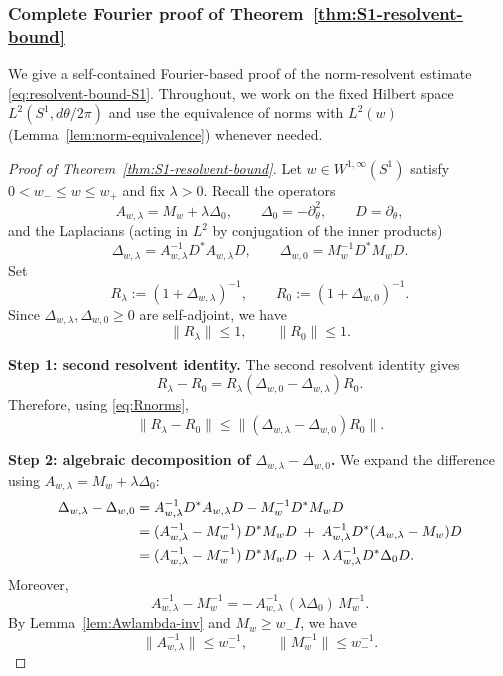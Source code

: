 \documentclass{amsart}
\numberwithin{equation}{section}
\theoremstyle{definition}
\theoremstyle{remark}
\begin{document}
\subsubsection{Complete Fourier proof of Theorem~\ref{thm:S1-resolvent-bound}}
\label{subsubsec:S1-complete-proof}

We give a self-contained Fourier-based proof of the norm-resolvent estimate
\eqref{eq:resolvent-bound-S1}. Throughout, we work on the fixed Hilbert space
$L^2(S^1,d\theta/2\pi)$ and use the equivalence of norms with $L^2(w)$
(Lemma~\ref{lem:norm-equivalence}) whenever needed.

\begin{proof}[Proof of Theorem~\ref{thm:S1-resolvent-bound}]
Let $w\in W^{1,\infty}(S^1)$ satisfy $0<w_-\le w\le w_+$ and fix $\lambda>0$.
Recall the operators
\[
A_{w,\lambda}=M_w+\lambda\Delta_0,\qquad \Delta_0=-\partial_\theta^2,\qquad D=\partial_\theta,
\]
and the Laplacians (acting in $L^2$ by conjugation of the inner products)
\[
\Delta_{w,\lambda}=A_{w,\lambda}^{-1}D^*A_{w,\lambda}D,
\qquad
\Delta_{w,0}=M_w^{-1}D^*M_wD.
\]
Set
\[
R_\lambda:=(1+\Delta_{w,\lambda})^{-1},\qquad R_0:=(1+\Delta_{w,0})^{-1}.
\]
Since $\Delta_{w,\lambda},\Delta_{w,0}\ge 0$ are self-adjoint, we have
\begin{equation}\label{eq:Rnorms}
\|R_\lambda\|\le 1,\qquad \|R_0\|\le 1.
\end{equation}

\medskip
\noindent\textbf{Step 1: second resolvent identity.}
The second resolvent identity gives
\begin{equation}\label{eq:2nd-resolvent-identity-complete}
R_\lambda-R_0
=
R_\lambda(\Delta_{w,0}-\Delta_{w,\lambda})R_0.
\end{equation}
Therefore, using \eqref{eq:Rnorms},
\begin{equation}\label{eq:reduce-to-Delta-diff}
\|R_\lambda-R_0\|
\le
\|(\Delta_{w,\lambda}-\Delta_{w,0})R_0\|.
\end{equation}

\medskip
\noindent\textbf{Step 2: algebraic decomposition of $\Delta_{w,\lambda}-\Delta_{w,0}$.}
We expand the difference using $A_{w,\lambda}=M_w+\lambda\Delta_0$:
\begin{align}
\Delta_{w,\lambda}-\Delta_{w,0}
&=
A_{w,\lambda}^{-1}D^*A_{w,\lambda}D
-
M_w^{-1}D^*M_wD \notag\\
&=
(A_{w,\lambda}^{-1}-M_w^{-1})\,D^*M_wD
\;+\;
A_{w,\lambda}^{-1}D^*(A_{w,\lambda}-M_w)D \notag\\
&=
(A_{w,\lambda}^{-1}-M_w^{-1})\,D^*M_wD
\;+\;
\lambda\,A_{w,\lambda}^{-1}D^*\Delta_0 D.
\label{eq:Delta-diff-decomp-complete}
\end{align}
Moreover,
\begin{equation}\label{eq:inverse-diff}
A_{w,\lambda}^{-1}-M_w^{-1}
=
-\,A_{w,\lambda}^{-1}\,(\lambda\Delta_0)\,M_w^{-1}.
\end{equation}
By Lemma~\ref{lem:Awlambda-inv} and $M_w\ge w_-I$, we have
\begin{equation}\label{eq:inv-bounds}
\|A_{w,\lambda}^{-1}\|\le w_-^{-1},\qquad \|M_w^{-1}\|\le w_-^{-1}.
\end{equation}


\end{proof}
\end{document}
